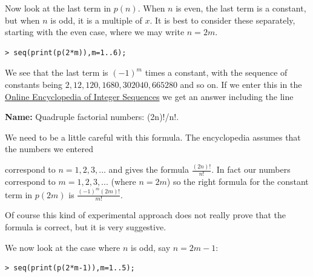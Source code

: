 \documentclass{article}
\begin{document}
\begin{Maple Normal}
Now look at the last term in 
$p (n)$.  When 
$n$ is even, the last term is a constant, but when 
$n$ is odd, it is a multiple of 
$x$.  It is best to consider these separately, starting with the even case, where we may write 
$n =2 m$.
\end{Maple Normal}
\begin{lstlisting}
> seq(print(p(2*m)),m=1..6);
\end{lstlisting}
\begin{Maple Normal}
We see that the last term is 
$(-1)^{m}$ times a constant, with the sequence of constants being 
$2,12,120,1680,302040,665280$ and so on.  If we enter this in the \href{http://www.research.att.com/~njas/sequences/}{Online Encyclopedia of Integer Sequences}  we get an answer including the line 
\end{Maple Normal}
\begin{Maple Normal}

\end{Maple Normal}
\begin{center}
\textbf{Name:  }    Quadruple factorial numbers: (2n)!/n!.\end{center}
\begin{Maple Normal}

\end{Maple Normal}
\begin{Maple Normal}
We need to be a little careful with this formula.  The encyclopedia assumes that the numbers we entered
\end{Maple Normal}
\begin{Maple Normal}
correspond to 
$n =1,2,3,\mathit{...}$ and gives the formula 
$\frac{(2 n)!}{n !}$.  In fact our numbers correspond to 
$m =1,2,3,\mathit{...}$ (where 
$n =2 m$) so the right formula for the constant term in 
$p (2 m)$ is 
$\frac{(-1)^{m} (2 m)!}{m !}$.
\end{Maple Normal}
\begin{Maple Normal}
Of course this kind of experimental approach does not really prove that the formula is correct, but it is very suggestive.
\end{Maple Normal}
\begin{Maple Normal}

\end{Maple Normal}
\begin{Maple Normal}
We now look at the case where 
$n$ is odd, say 
$n =2 m -1$:
\end{Maple Normal}
\begin{lstlisting}
> seq(print(p(2*m-1)),m=1..5);
\end{lstlisting}
\end{document}
